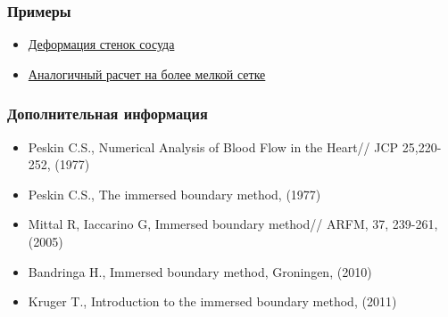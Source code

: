 \documentclass[14pt]{beamer}
\begin{document}
\begin{frame}
\frametitle{Примеры}
\begin{itemize}
    \item \href{run:video/cylinder1.avi}{Деформация стенок сосуда}
    \item \href{run:video/cylinder2.avi}{Аналогичный расчет на более мелкой сетке}
\end{itemize}
\end{frame}

\begin{frame}
\frametitle{Дополнительная информация}
    \begin{itemize}
        \item Peskin C.S., Numerical Analysis of Blood Flow in the Heart// JCP 25,220-252, (1977)
        \item Peskin C.S., The immersed boundary method, (1977)
        \item Mittal R, Iaccarino G, Immersed boundary method// ARFM, 37, 239-261, (2005)
        \item Bandringa H., Immersed boundary method, Groningen, (2010)
        \item Kruger T., Introduction to the immersed boundary method, (2011)
    \end{itemize}
\end{frame}
\end{document}
